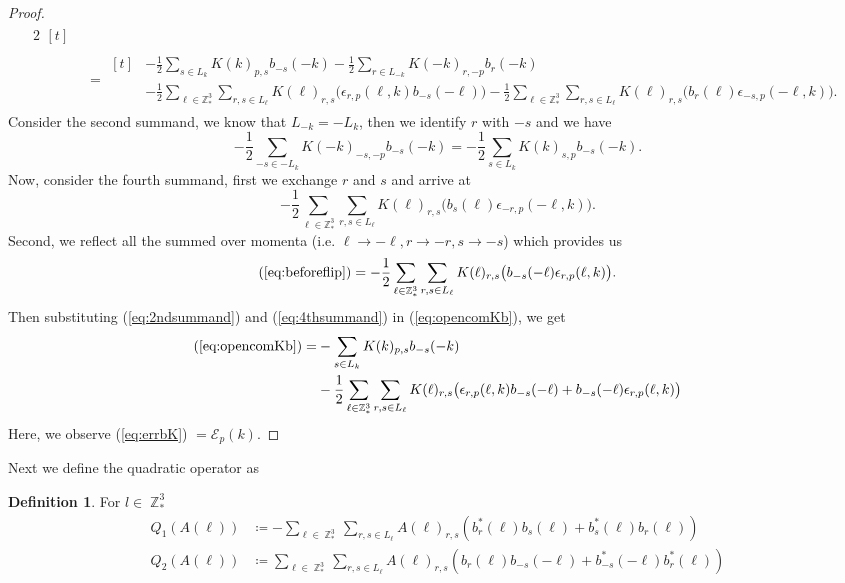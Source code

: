 \documentclass[sn-mathphys,Numbered, a4paper ,nocrop]{sn-jnl}%
\DeclareMathOperator{\Z}{\mathbb{Z}}
\newcommand{\half}{\frac{1}{2}}
\theoremstyle{plain}
\theoremstyle{definition}
\newtheorem{definition}[theorem]{Definition}
\theoremstyle{remark}
\theoremstyle{plain}
\theoremstyle{definition}
\theoremstyle{remark}
\begin{document}
\begin{proof}
\begin{alignat}{2}
\begin{aligned}[t]
      \end{aligned}\nonumber\\
      &=\begin{aligned}[t]
          &-\half\sum\limits_{s\in L_k}K(k)_{p,s}b_{-s}(-k) - \half\sum\limits_{r\in L_{-k}}K(-k)_{r,-p}b_{r}(-k) \\
      &- \half\sum\limits_{\ell\in \mathbb{Z}^3_*}\sum\limits_{r,s\in L_\ell}K(\ell)_{r,s}\big(\epsilon_{r,p}(\ell,k)b_{-s}(-\ell)\big) - \half\sum\limits_{\ell\in \mathbb{Z}^3_*}\sum\limits_{r,s\in L_\ell}K(\ell)_{r,s}\big(b_{r}(\ell)\epsilon_{-s,p}(-\ell,k)\big).\label{eq:opencomKb}
      \end{aligned}
   \end{alignat}
   Consider the second summand, we know that $L_{-k}=-L_k$,
   then we identify $r$ with $-s$ and we have
   \begin{equation}\label{eq:2ndsummand}
        - \half\sum\limits_{-s\in -L_{k}}K(-k)_{-s,-p}b_{-s}(-k) =- \half\sum\limits_{s\in L_{k}}K(k)_{s,p}b_{-s}(-k) .
   \end{equation}
   Now, consider the fourth summand, first we exchange $r$ and $s$ and arrive at
   \begin{equation}\label{eq:beforeflip}
       - \half\sum\limits_{\ell\in \mathbb{Z}^3_*}\sum\limits_{r,s\in L_\ell}K(\ell)_{r,s}\big(b_{s}(\ell)\epsilon_{-r,p}(-\ell,k)\big).
   \end{equation}
   Second, we reflect all the summed over momenta (i.e. $\ell\rightarrow-\ell, r\rightarrow-r, s\rightarrow-s$) which provides us
   \begin{equation}\label{eq:4thsummand}
       (\ref{eq:beforeflip}) = - \half\sum\limits_{\ell\in \mathbb{Z}^3_*}\sum\limits_{r,s\in L_\ell}K(\ell)_{r,s}\big(b_{-s}(-\ell)\epsilon_{r,p}(\ell,k)\big).
   \end{equation}
   Then substituting (\ref{eq:2ndsummand}) and (\ref{eq:4thsummand}) in (\ref{eq:opencomKb}), we get
   \begin{align}
       (\ref{eq:opencomKb})=&-\sum\limits_{s\in L_k}K(k)_{p,s}b_{-s}(-k)  \\
      &- \half\sum\limits_{\ell\in \mathbb{Z}^3_*}\sum\limits_{r,s\in L_\ell}K(\ell)_{r,s}\big(\epsilon_{r,p}(\ell,k)b_{-s}(-\ell)+b_{-s}(-\ell)\epsilon_{r,p}(\ell,k)\big)\label{eq:errbK}
   \end{align}
   Here, we observe (\ref{eq:errbK}) $=  \mathcal{E}_{p}(k) $.
\end{proof}
Next we define the quadratic operator as 
\begin{definition}
For $l \in \Z^3_*$
\begin{align} 
    Q_1(A(\ell))&\coloneq  -\sum\limits_{\ell \in \Z^3_*}\sum\limits_{r,s \in L_{\ell}}A(\ell)_{r,s} \left(b^*_r(\ell)b_{s}(\ell)+b^*_{s}(\ell)b_{r}(\ell)\right)\label{eq:Q1}\\ 
    Q_2(A(\ell))&\coloneq  \sum\limits_{\ell \in \Z^3_*}\sum\limits_{r,s \in L_{\ell}}A(\ell)_{r,s} \left(b_r(\ell)b_{-s}(-\ell)+b^*_{-s}(-\ell)b^*_{r}(\ell)\right)\label{eq:Q2}
\end{align}
    
\end{definition}
\end{document}
